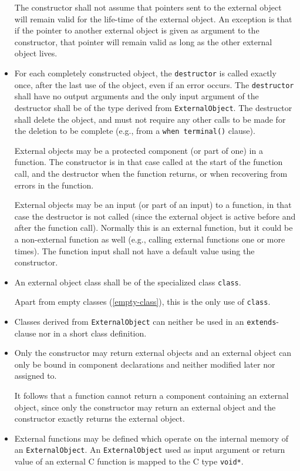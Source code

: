 \begin{itemize}
  The constructor shall not assume that pointers sent to the external object will remain valid for the life-time of the external object.
  An exception is that if the pointer to another external object is given as argument to the constructor, that pointer will remain valid as long as the other external object lives.
\item
  For each completely constructed object, the {\lstinline!destructor!} is called exactly once, after the last use of the object, even if an error occurs.
  The {\lstinline!destructor!} shall have no output arguments and the only input argument of the destructor shall be of the type derived from {\lstinline!ExternalObject!}.
  The destructor shall delete the object, and must not require any other calls to be made for the deletion to be complete (e.g., from a {\lstinline!when terminal()!} clause).
  \begin{nonnormative}
  External objects may be a protected component (or part of one) in a function.
  The constructor is in that case called at the start of the function call, and the destructor when the function returns, or when recovering from errors in the function.
  \end{nonnormative}
  \begin{nonnormative}
  External objects may be an input (or part of an input) to a function, in that case the destructor is not called (since the external object is active before and after the function call).
  Normally this is an external function, but it could be a non-external function as well (e.g., calling external functions one or more times).
  The function input shall not have a default value using the constructor.
  \end{nonnormative}
\item
  An external object class shall be of the specialized class {\lstinline!class!}.
  \begin{nonnormative}
  Apart from empty classes (\cref{empty-class}), this is the only use of {\lstinline!class!}.
  \end{nonnormative}
\item
  Classes derived from {\lstinline!ExternalObject!} can neither be used in an {\lstinline!extends!}-clause nor in a short class definition.
\item
  Only the constructor may return external objects and an external object can only be bound in component declarations and neither modified later nor assigned to.
  \begin{nonnormative}
  It follows that a function cannot return a component containing an external object, since only the constructor may return an external object and the constructor exactly returns the external object.
  \end{nonnormative}
\item
  External functions may be defined which operate on the internal memory of an {\lstinline!ExternalObject!}.
  An {\lstinline!ExternalObject!} used as input argument or return value of an external C function is mapped to the C type {\lstinline!void*!}.
\end{itemize}

